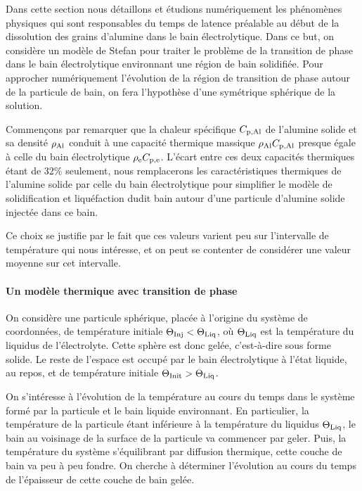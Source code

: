 Dans cette section nous détaillons et étudions numériquement les
phénomènes physiques qui sont responsables du temps de latence
préalable au début de la dissolution des grains d'alumine dans le bain
électrolytique. Dans ce but, on considère un modèle de Stefan pour
traiter le problème de la transition de phase dans le bain
électrolytique environnant une région de bain solidifiée. Pour
approcher numériquement l'évolution de la région de transition de
phase autour de la particule de bain, on fera l'hypothèse d'une
symétrique sphérique de la solution.

Commençons par remarquer que la chaleur spécifique $C_{\mathrm{p,Al}}$ de
l'alumine solide et sa densité $\rho_\mathrm{Al}$ conduit à une
capacité thermique massique $\rho_\mathrm{Al}C_{\mathrm{p,Al}}$ presque égale
à celle du bain électrolytique
$\rho_\mathrm{e}C_{\mathrm{p,e}}$. L'écart entre ces deux capacités
thermiques étant de \num{32}\% seulement, nous remplacerons les
caractéristiques thermiques de l'alumine solide par celle du bain
électrolytique pour simplifier le modèle de solidification et
liquéfaction dudit bain autour d'une particule d'alumine solide
injectée dans ce bain.

Ce choix se justifie par le fait que ces valeurs varient peu sur
l'intervalle de température qui nous intéresse, et on peut se
contenter de considérer une valeur moyenne sur cet intervalle.

\paragraph{Un modèle thermique avec transition de phase}
On considère une particule sphérique, placée à l'origine du système de
coordonnées, de température initiale $\Theta_\text{Inj}<\Theta_\text{Liq}$, où $\Theta_\text{Liq}$ est la
température du liquidus de l'électrolyte. Cette sphère est donc gelée,
c'est-à-dire sous forme solide. Le reste de l'espace est occupé par le
bain électrolytique à l'état liquide, au repos, et de température
initiale $\Theta_\text{Init} > \Theta_\text{Liq}$.

On s'intéresse à l'évolution de la température au cours du temps dans
le système formé par la particule et le bain liquide environnant. En
particulier, la température de la particule étant inférieure à la
température du liquidus $\Theta_\text{Liq}$, le bain au voisinage de la surface de
la particule va commencer par geler. Puis, la température du système
s'équilibrant par diffusion thermique, cette couche de bain va peu à
peu fondre. On cherche à déterminer l'évolution au cours du temps de
l'épaisseur de cette couche de bain gelée.

